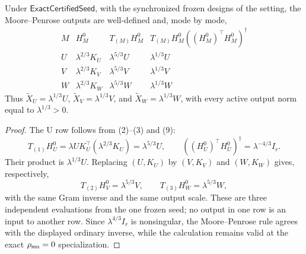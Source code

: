 \begin{proposition}\label{prop:step-013-frozen-landing}
Under \(\mathsf{ExactCertifiedSeed}\), with
the synchronized frozen designs of the setting, the Moore--Penrose outputs
are well-defined and, mode by mode,
\[
\begin{array}{c|c|c|c}
M & H_M^0 & T_{(M)}H_M^0 &
T_{(M)}H_M^0((H_M^0)^\top H_M^0)^\dagger\\ \hline
U & \lambda^{2/3}K_U & \lambda^{5/3}U & \lambda^{1/3}U\\
V & \lambda^{2/3}K_V & \lambda^{5/3}V & \lambda^{1/3}V\\
W & \lambda^{2/3}K_W & \lambda^{5/3}W & \lambda^{1/3}W
\end{array}
\tag{10}
\]
Thus \(\widetilde X_U=\lambda^{1/3}U\),
\(\widetilde X_V=\lambda^{1/3}V\), and
\(\widetilde X_W=\lambda^{1/3}W\), with every active output norm equal to
\(\lambda^{1/3}>0\).

\begin{proof}
The U row follows from (2)--(3) and (9):
\[
T_{(1)}H_U^0
=\lambda U K_U^\top(\lambda^{2/3}K_U)
=\lambda^{5/3}U,\qquad
((H_U^0)^\top H_U^0)^\dagger=\lambda^{-4/3}I_r.
\tag{11}
\]
Their product is \(\lambda^{1/3}U\). Replacing \((U,K_U)\) by
\((V,K_V)\) and \((W,K_W)\) gives, respectively,
\[
T_{(2)}H_V^0=\lambda^{5/3}V,\qquad
T_{(3)}H_W^0=\lambda^{5/3}W,
\tag{12}
\]
with the same Gram inverse and the same output scale. These are three
independent evaluations from the one frozen seed; no output in one row is an
input to another row. Since \(\lambda^{4/3}I_r\) is nonsingular, the
Moore--Penrose rule agrees with the displayed ordinary inverse, while the
calculation remains valid at the exact \(\rho_{\rm sm}=0\) specialization.



\end{proof}
\end{proposition}
